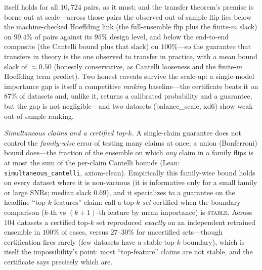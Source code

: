 \documentclass[11pt,a4paper]{article}
\begin{document}
itself holds for all $10{,}724$ pairs, as it must; and the transfer theorem's premise is borne out at
scale---across those pairs the observed out-of-sample flip lies below the machine-checked Hoeffding link
(the full-ensemble flip plus the finite-$m$ slack) on $99.4\%$ of pairs against its $95\%$ design level,
and below the end-to-end composite (the Cantelli bound plus that slack) on $100\%$---so the guarantee that
transfers in theory is the one observed to transfer in practice, with a mean bound slack of ${\approx}0.50$
(honestly conservative, as Cantelli looseness and the finite-$m$ Hoeffding term predict).  Two honest caveats survive the scale-up: a single-model importance gap is itself
a competitive \emph{ranking} baseline---the certificate beats it on $87\%$ of datasets and, unlike
it, returns a calibrated probability and a guarantee, but the gap is not negligible---and two
datasets (balance\_scale, xd6) show weak out-of-sample ranking.

\emph{Simultaneous claims and a certified top-$k$.}  A single-claim guarantee does not control the
\emph{family-wise} error of testing many claims at once; a union (Bonferroni) bound does---the
fraction of the ensemble on which \emph{any} claim in a family flips is at most the sum of the
per-claim Cantelli bounds (Lean: \texttt{simultaneous\_cantelli}, axiom-clean).  Empirically this
family-wise bound holds on every dataset where it is non-vacuous (it is informative only for a small
family or large SNRs; median slack $0.69$), and it specializes to a guarantee on the headline
``top-$k$ features'' claim: call a top-$k$ \emph{set} certified when the boundary comparison ($k$-th
vs $(k{+}1)$-th feature by mean importance) is \textsc{stable}.  Across $104$ datasets a certified
top-$k$ set reproduced \emph{exactly} on an independent retrained ensemble in $100\%$ of cases, versus
$27$--$30\%$ for uncertified sets---though certification fires rarely (few datasets have a stable
top-$k$ boundary), which is itself the impossibility's point: most ``top-feature'' claims are not
stable, and the certificate says precisely which are.
\end{document}
